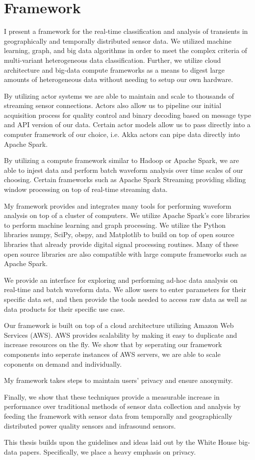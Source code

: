 \section{Framework}
I present a framework for the real-time classification and analysis of transients in geographically and temporally distributed sensor data. We utilized machine learning, graph, and big data algorithms in order to meet the complex criteria of multi-variant heterogeneous data classification. Further, we utilize cloud architecture and big-data compute frameworks as a means to digest large amounts of heterogeneous data without needing to setup our own hardware.

By utilizing actor systems we are able to maintain and scale to thousands of streaming sensor connections. Actors also allow us to pipeline our initial acquisition process for quality control and binary decoding based on message type and API version of our data. Certain actor models allow us to pass directly into a computer framework of our choice, i.e. Akka actors can pipe data directly into Apache Spark.

By utilizing a compute framework similar to Hadoop or Apache Spark, we are able to injest data and perform batch waveform analysis over time scales of our choosing. Certain frameworks such as Apache Spark Streaming providing sliding window processing on top of real-time streaming data. 

My framework provides and integrates many tools for performing waveform analysis on top of a cluster of computers. We utilize Apache Spark's core libraries to perform machine learning and graph processing. We utilize the Python libraries numpy, SciPy, obspy, and Matplotlib to build on top of open source libraries that already provide digital signal processing routines. Many of these open source libraries are also compatible with large compute frameworks such as Apache Spark.

We provide an interface for exploring and performing ad-hoc data analysis on real-time and batch waveform data. We allow users to enter parameters for their specific data set, and then provide the tools needed to access raw data as well as data products for their specific use case.

Our framework is built on top of a cloud architecture utilizing Amazon Web Services (AWS). AWS provides scalability by making it easy to duplicate and increase resources on the fly. We show that by seperating our framework components into seperate instances of AWS servers, we are able to scale coponents on demand and individually.

My framework takes steps to maintain users' privacy and ensure anonymity.

Finally, we show that these techniques provide a measurable increase in performance over traditional methods of sensor data collection and analysis by feeding the framework with sensor data from temporally and geographically distributed power quality sensors and infrasound sensors. 

This thesis builds upon the guidelines and ideas laid out by the White House big-data papers. Specifically, we place a heavy emphasis on privacy. 
